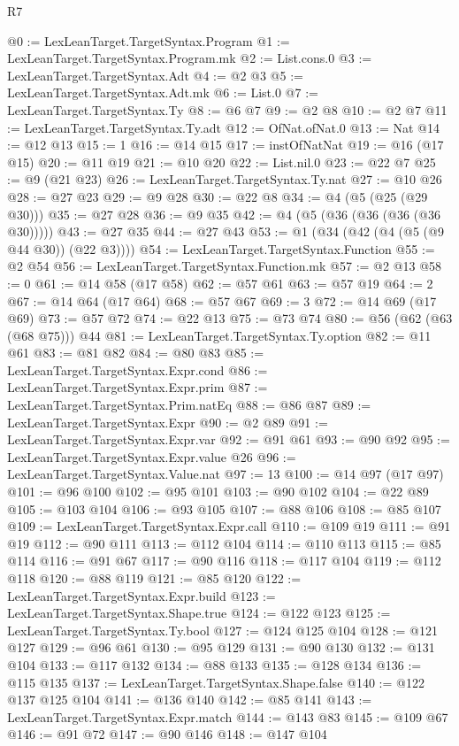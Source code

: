 \begin{lexlean}{R7}
\begin{coremodule}
@0 := LexLeanTarget.TargetSyntax.Program
@1 := LexLeanTarget.TargetSyntax.Program.mk
@2 := List.cons.{0}
@3 := LexLeanTarget.TargetSyntax.Adt
@4 := @2 @3
@5 := LexLeanTarget.TargetSyntax.Adt.mk
@6 := List.{0}
@7 := LexLeanTarget.TargetSyntax.Ty
@8 := @6 @7
@9 := @2 @8
@10 := @2 @7
@11 := LexLeanTarget.TargetSyntax.Ty.adt
@12 := OfNat.ofNat.{0}
@13 := Nat
@14 := @12 @13
@15 := 1
@16 := @14 @15
@17 := instOfNatNat
@19 := @16 (@17 @15)
@20 := @11 @19
@21 := @10 @20
@22 := List.nil.{0}
@23 := @22 @7
@25 := @9 (@21 @23)
@26 := LexLeanTarget.TargetSyntax.Ty.nat
@27 := @10 @26
@28 := @27 @23
@29 := @9 @28
@30 := @22 @8
@34 := @4 (@5 (@25 (@29 @30)))
@35 := @27 @28
@36 := @9 @35
@42 := @4 (@5 (@36 (@36 (@36 (@36 @30)))))
@43 := @27 @35
@44 := @27 @43
@53 := @1 (@34 (@42 (@4 (@5 (@9 @44 @30)) (@22 @3))))
@54 := LexLeanTarget.TargetSyntax.Function
@55 := @2 @54
@56 := LexLeanTarget.TargetSyntax.Function.mk
@57 := @2 @13
@58 := 0
@61 := @14 @58 (@17 @58)
@62 := @57 @61
@63 := @57 @19
@64 := 2
@67 := @14 @64 (@17 @64)
@68 := @57 @67
@69 := 3
@72 := @14 @69 (@17 @69)
@73 := @57 @72
@74 := @22 @13
@75 := @73 @74
@80 := @56 (@62 (@63 (@68 @75))) @44
@81 := LexLeanTarget.TargetSyntax.Ty.option
@82 := @11 @61
@83 := @81 @82
@84 := @80 @83
@85 := LexLeanTarget.TargetSyntax.Expr.cond
@86 := LexLeanTarget.TargetSyntax.Expr.prim
@87 := LexLeanTarget.TargetSyntax.Prim.natEq
@88 := @86 @87
@89 := LexLeanTarget.TargetSyntax.Expr
@90 := @2 @89
@91 := LexLeanTarget.TargetSyntax.Expr.var
@92 := @91 @61
@93 := @90 @92
@95 := LexLeanTarget.TargetSyntax.Expr.value @26
@96 := LexLeanTarget.TargetSyntax.Value.nat
@97 := 13
@100 := @14 @97 (@17 @97)
@101 := @96 @100
@102 := @95 @101
@103 := @90 @102
@104 := @22 @89
@105 := @103 @104
@106 := @93 @105
@107 := @88 @106
@108 := @85 @107
@109 := LexLeanTarget.TargetSyntax.Expr.call
@110 := @109 @19
@111 := @91 @19
@112 := @90 @111
@113 := @112 @104
@114 := @110 @113
@115 := @85 @114
@116 := @91 @67
@117 := @90 @116
@118 := @117 @104
@119 := @112 @118
@120 := @88 @119
@121 := @85 @120
@122 := LexLeanTarget.TargetSyntax.Expr.build
@123 := LexLeanTarget.TargetSyntax.Shape.true
@124 := @122 @123
@125 := LexLeanTarget.TargetSyntax.Ty.bool
@127 := @124 @125 @104
@128 := @121 @127
@129 := @96 @61
@130 := @95 @129
@131 := @90 @130
@132 := @131 @104
@133 := @117 @132
@134 := @88 @133
@135 := @128 @134
@136 := @115 @135
@137 := LexLeanTarget.TargetSyntax.Shape.false
@140 := @122 @137 @125 @104
@141 := @136 @140
@142 := @85 @141
@143 := LexLeanTarget.TargetSyntax.Expr.match
@144 := @143 @83
@145 := @109 @67
@146 := @91 @72
@147 := @90 @146
@148 := @147 @104

\end{coremodule}
\end{lexlean}
